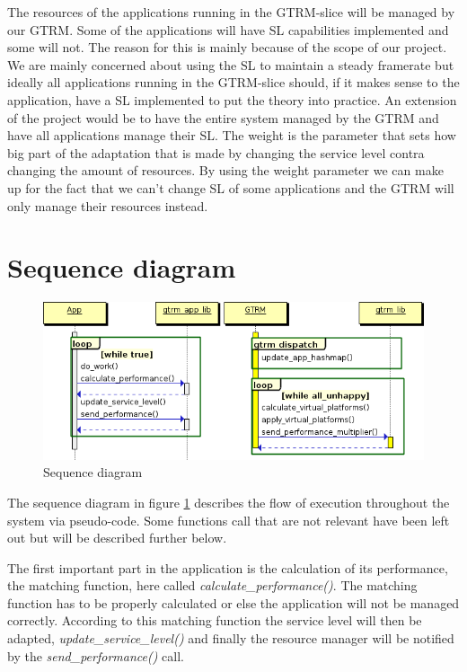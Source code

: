 \documentclass[nobiblatex]{LTHthesis}
\begin{document}
The resources of the applications running in the GTRM-slice will be managed by our GTRM. Some of the applications will have SL capabilities implemented and some will not. The reason for this is mainly because of the scope of our project. We are mainly concerned about using the SL to maintain a steady framerate but ideally all applications running in the GTRM-slice should, if it makes sense to the application, have a SL implemented to put the theory into practice. An extension of the project would be to have the entire system managed by the GTRM and have all applications manage their SL. The weight is the parameter that sets how big part of the adaptation that is made by changing the service level contra changing the amount of resources. By using the weight parameter we can make up for the fact that we can’t change SL of some applications and the GTRM will only manage their resources instead. 

\section{Sequence diagram}
\begin{figure}
    \centering
    \includegraphics[width=\textwidth]{diag.png}
    \caption{Sequence diagram}
    \label{fig:sdiag}
\end{figure}
The sequence diagram in figure \ref{fig:sdiag} describes the flow of execution throughout the system via pseudo-code. Some functions call that are not relevant have been left out but will be described further below. 

The first important part in the application is the calculation of its performance, the matching function, here called \emph{calculate\_performance()}. The matching function has to be properly calculated or else the application will not be managed correctly. According to this matching function the service level will then be adapted, \emph{update\_service\_level()} and finally the resource manager will be notified by the \emph{send\_performance()} call.
\end{document}

